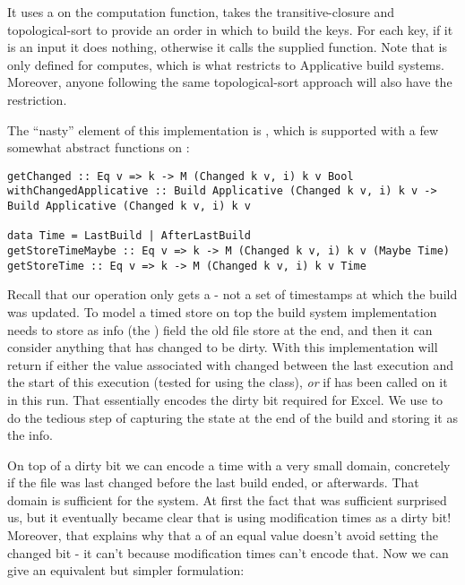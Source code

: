 It uses a  on the computation function, takes the transitive-closure and topological-sort to provide an order in which to build the keys. For each key, if it is an input it does nothing, otherwise it calls the supplied  function. Note that  is only defined for  computes, which is what restricts \Make to Applicative build systems. Moreover, anyone following the same topological-sort approach will also have the  restriction.

The ``nasty'' element of this implementation is , which is supported with a few somewhat abstract functions on :

\begin{verbatim}
getChanged :: Eq v => k -> M (Changed k v, i) k v Bool
withChangedApplicative :: Build Applicative (Changed k v, i) k v -> Build Applicative (Changed k v, i) k v

data Time = LastBuild | AfterLastBuild
getStoreTimeMaybe :: Eq v => k -> M (Changed k v, i) k v (Maybe Time)
getStoreTime :: Eq v => k -> M (Changed k v, i) k v Time
\end{verbatim}

Recall that our  operation only gets a  - not a set of timestamps at which the build was updated. To model a timed store on top the build system implementation needs to store as info (the ) field the old file store at the end, and then it can consider anything that has changed to be dirty. With this implementation  will return  if either the value associated with  changed between the last execution and the start of this execution (tested for using the  class), \textit{or} if  has been called on it in this run. That essentially encodes the dirty bit required for Excel. We use  to do the tedious step of capturing the state at the end of the build and storing it as the info.

On top of a dirty bit we can encode a time with a very small domain, concretely if the file was last changed before the last build ended, or afterwards. That domain is sufficient for the \Make system. At first the fact that was sufficient surprised us, but it eventually became clear that \Make is using modification times as a dirty bit! Moreover, that explains why that a  of an equal value doesn't avoid setting the changed bit - it can't because modification times can't encode that. Now we can give an equivalent but simpler formulation:

